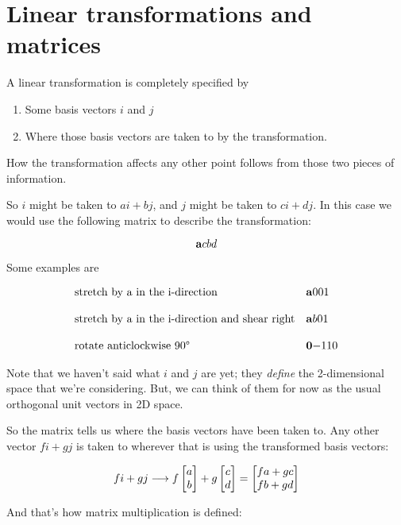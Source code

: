 \section{Linear transformations and matrices}

A linear transformation is completely specified by

\begin{enumerate}
\item Some basis vectors $i$ and $j$
\item Where those basis vectors are taken to by the transformation.
\end{enumerate}

How the transformation affects any other point follows from those two pieces of
information.

So $i$ might be taken to $ai + bj$, and $j$ might be taken to $ci + dj$.
In this case we would use the following matrix to describe the
transformation:

$$
\mathbf{a}{c}
    {b}{d}
$$

Some examples are

$$
\begin{array}{ll}
\text{stretch by a in the i-direction} & \mathbf{a}{0}
                                             {0}{1}
\\\\
\text{stretch by a in the i-direction and shear right} & \mathbf{a}{b}
                                                             {0}{1}
\\\\
\text{rotate anticlockwise 90°} & \mathbf{0}{-1}
                                      {1}{ 0}
\end{array}
$$

Note that we haven't said what $i$ and $j$ are yet; they \textit{define} the
2-dimensional space that we're considering. But, we can think of them for now
as the usual orthogonal unit vectors in 2D space.

So the matrix tells us where the basis vectors have been taken to. Any other
vector $fi + gj$ is taken to wherever that is using the transformed basis
vectors:

$$
fi + gj \longrightarrow f\begin{bmatrix}a\\b\end{bmatrix} + g\begin{bmatrix}c\\d\end{bmatrix} = \begin{bmatrix}fa + gc\\fb + gd\end{bmatrix}
$$


And that's how matrix multiplication is defined:

